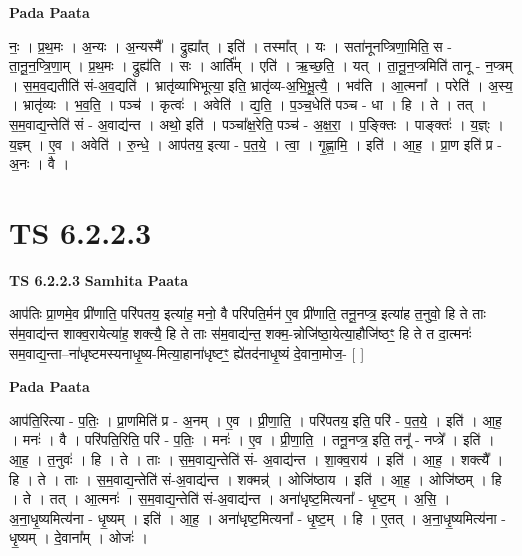 \documentclass[17pt]{extarticle}
\begin{document}
\textbf{Pada Paata} \newline

नः॒ । प्र॒थ॒मः । अ॒न्यः । अ॒न्यस्मै᳚ । द्रुह्या᳚त् । इति॑ । तस्मा᳚त् । यः । सता॑नूनप्त्रिणा॒मिति॒ स - ता॒नू॒न॒प्त्रि॒णा॒म् । प्र॒थ॒मः । द्रुह्य॑ति । सः । आर्ति᳚म् । एति॑ । ऋ॒च्छ॒ति॒ । यत् । ता॒नू॒न॒प्त्रमिति॑ तानू - न॒प्त्रम् । स॒म॒व॒द्यतीति॑ सं-अ॒व॒द्यति॑ । भ्रातृ॑व्याभिभूत्या॒ इति॒ भ्रातृ॑व्य-अ॒भि॒भू॒त्यै॒ । भव॑ति । आ॒त्मना᳚ । परेति॑ । अ॒स्य॒ । भ्रातृ॑व्यः । भ॒व॒ति॒ । पञ्च॑ । कृत्वः॑ । अवेति॑ । द्य॒ति॒ । प॒ञ्च॒धेति॑ पञ्च - धा । हि । ते । तत् । स॒म॒वाद्य॒न्तेति॑ सं - अ॒वाद्य॑न्त । अथो॒ इति॑ । पञ्चा᳚क्ष॒रेति॒ पञ्च॑ - अ॒क्ष॒रा॒ । प॒ङ्क्तिः । पाङ्क्तः॑ । य॒ज्ञ्ः । य॒ज्ञ्म् । ए॒व । अवेति॑ । रु॒न्धे॒ । आप॑तय॒ इत्या - प॒त॒ये॒ । त्वा॒ । गृ॒ह्णा॒मि॒ । इति॑ । आ॒ह॒ । प्रा॒ण इति॑ प्र - अ॒नः । वै ।  \newline




\section*{ TS 6.2.2.3 }

\textbf{TS 6.2.2.3 } \newline
\textbf{Samhita Paata} \newline

आप॑तिः प्रा॒णमे॒व प्री॑णाति॒ परि॑पतय॒ इत्या॑ह॒ मनो॒ वै परि॑पति॒र्मन॑ ए॒व प्री॑णाति॒ तनू॒नप्त्र॒ इत्या॑ह त॒नुवो॒ हि ते ताः स॑म॒वाद्य॑न्त शाक्व॒रायेत्या॑ह॒ शक्त्यै॒ हि ते ताः स॑म॒वाद्य॑न्त॒ शक्म॒-न्नोजि॑ष्ठा॒येत्या॒हौजि॑ष्ठꣳ॒॒ हि ते त दा॒त्मनः॑ सम॒वाद्य॒न्ता--ना॑धृष्टमस्यनाधृ॒ष्य-मित्या॒हाना॑धृष्टꣳ॒॒ ह्ये॑तद॑नाधृ॒ष्यं दे॒वाना॒मोज॒- [  ] \newline

\textbf{Pada Paata} \newline

आप॑ति॒रित्या - प॒तिः॒ । प्रा॒णमिति॑ प्र - अ॒नम् । ए॒व । प्री॒णा॒ति॒ । परि॑पतय॒ इति॒ परि॑ - प॒त॒ये॒ । इति॑ । आ॒ह॒ । मनः॑ । वै । परि॑पति॒रिति॒ परि॑ - प॒तिः॒ । मनः॑ । ए॒व । प्री॒णा॒ति॒ । तनू॒नप्त्र॒ इति॒ तनू᳚ - नप्त्रे᳚ । इति॑ । आ॒ह॒ । त॒नुवः॑ । हि । ते । ताः । स॒म॒वाद्य॒न्तेति॑ सं- अ॒वाद्य॑न्त । शा॒क्व॒राय॑ । इति॑ । आ॒ह॒ । शक्त्यै᳚ । हि । ते । ताः । स॒म॒वाद्य॒न्तेति॑ सं-अ॒वाद्य॑न्त । शक्मन्न्॑ । ओजि॑ष्ठाय । इति॑ । आ॒ह॒ । ओजि॑ष्ठम् । हि । ते । तत् । आ॒त्मनः॑ । स॒म॒वाद्य॒न्तेति॑ सं-अ॒वाद्य॑न्त । अना॑धृष्ट॒मित्यना᳚ - धृ॒ष्ट॒म् । अ॒सि॒ । अ॒ना॒धृ॒ष्यमित्य॑ना - धृ॒ष्यम् । इति॑ । आ॒ह॒ । अना॑धृष्ट॒मित्यना᳚ - धृ॒ष्ट॒म् । हि । ए॒तत् । अ॒ना॒धृ॒ष्यमित्य॑ना - धृ॒ष्यम् । दे॒वाना᳚म् । ओजः॑ ।  \newline
\end{document}
